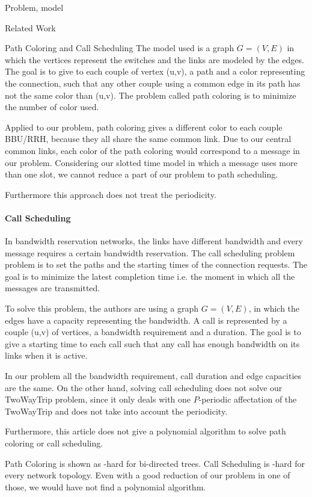 \documentclass[a4paper,10pt]{report}
\begin{document}
\begin{chapter}{Problem, model}
\begin{section}{Related Work}
\begin{subsection}{Path Coloring and Call Scheduling}
The model used is a graph $G=(V,E)$ in which the vertices represent the switches and the links are modeled by the edges. The goal is to give to each
couple of vertex (u,v), a path and a color representing the connection, such that any other couple using a common edge in its path has not the same
color than (u,v). The problem called path coloring is to minimize the number of color used.

Applied to our problem, path coloring gives a different color to each couple BBU/RRH, because they all share the same common link.
Due to our central common links, each color of the path coloring
would correspond to a message in our problem. Considering our slotted time model in which a message uses more than one slot,
we cannot reduce a part of our problem to path scheduling.

Furthermore this approach does not treat the periodicity. 

\paragraph{Call Scheduling}
In bandwidth reservation networks, the links have different bandwidth and every message 
requires a certain bandwidth reservation. The call scheduling problem problem is to set the paths and the starting times of the connection requests.
The goal is to minimize the latest completion time i.e. the moment in which all the messages are transmitted.

To solve this problem, the authors are using a graph $G=(V,E)$, in which the edges have a capacity representing the bandwidth.
A call is represented by a couple (u,v) of vertices, a bandwidth requirement and a duration. The goal is to give a starting time to each call
such that any call has enough bandwidth on its links when it is active.

In our problem all the bandwidth requirement, call duration and edge capacities are the same.
On the other hand, solving call scheduling does not solve our TwoWayTrip problem, since it only deals with one $P$-periodic affectation of the TwoWayTrip and does not take into account the periodicity.

Furthermore, this article does not give a polynomial algorithm to solve path coloring or call scheduling. 

Path Coloring is shown as \NP-hard for bi-directed trees. Call Scheduling is \NP-hard for every network topology. Even with a good reduction of our problem in one of those, we would have not find a polynomial algorithm.



\end{subsection}
\end{section}
\end{chapter}
\end{document}
